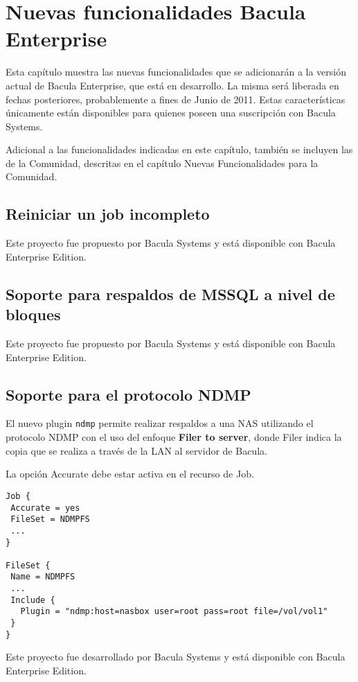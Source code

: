 \chapter{Nuevas funcionalidades Bacula Enterprise}
Esta capítulo muestra las nuevas funcionalidades que se adicionarán a la 
versión actual de Bacula Enterprise, que está en desarrollo. La misma será 
liberada en fechas posteriores, probablemente a fines de Junio de 2011. 
Estas características únicamente están disponibles para quienes poseen 
una suscripción con Bacula Systems.

Adicional a las funcionalidades indicadas en este capítulo, también 
se incluyen las de la Comunidad, descritas en el capítulo Nuevas Funcionalidades 
para la Comunidad.

\section{Reiniciar un job incompleto}

\medskip
Este proyecto fue propuesto por Bacula Systems y está disponible 
con Bacula Enterprise Edition.

\section{Soporte para respaldos de MSSQL a nivel de bloques}

Este proyecto fue propuesto por Bacula Systems y está disponible 
con Bacula Enterprise Edition.

\section{Soporte para el protocolo NDMP}

El nuevo plugin \texttt{ndmp} permite realizar respaldos a una NAS utilizando 
el protocolo NDMP con el uso del enfoque \textbf{Filer to server}, donde 
Filer indica la copia que se realiza a través de la LAN al servidor de Bacula.

La opción Accurate debe estar activa en el recurso de Job.
\begin{verbatim}
Job {
 Accurate = yes
 FileSet = NDMPFS
 ...
}

FileSet {
 Name = NDMPFS
 ...
 Include {
   Plugin = "ndmp:host=nasbox user=root pass=root file=/vol/vol1"
 }
}
\end{verbatim}

Este proyecto fue desarrollado por Bacula Systems y está disponible 
con Bacula Enterprise Edition.

